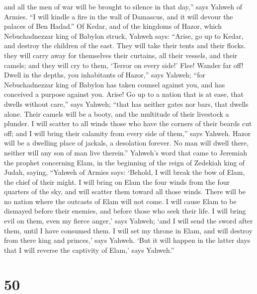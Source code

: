and all the men of war will be brought to silence in that day,'' says
Yahweh of Armies.  ``I will kindle a fire in the wall of
Damascus, and it will devour the palaces of Ben Hadad.'' 
Of Kedar, and of the kingdoms of Hazor, which Nebuchadnezzar king of
Babylon struck, Yahweh says: ``Arise, go up to Kedar, and destroy the
children of the east.  They will take their tents and
their flocks. they will carry away for themselves their curtains, all
their vessels, and their camels; and they will cry to them, `Terror on
every side!'  Flee! Wander far off! Dwell in the depths,
you inhabitants of Hazor,'' says Yahweh; ``for Nebuchadnezzar king of
Babylon has taken counsel against you, and has conceived a purpose
against you.  Arise! Go up to a nation that is at ease,
that dwells without care,'' says Yahweh; ``that has neither gates nor
bars, that dwells alone.  Their camels will be a booty,
and the multitude of their livestock a plunder. I will scatter to all
winds those who have the corners of their beards cut off; and I will
bring their calamity from every side of them,'' says Yahweh.
 Hazor will be a dwelling place of jackals, a desolation
forever. No man will dwell there, neither will any son of man live
therein.''  Yahweh's word that came to Jeremiah the
prophet concerning Elam, in the beginning of the reign of Zedekiah king
of Judah, saying,  ``Yahweh of Armies says: `Behold, I
will break the bow of Elam, the chief of their might.  I
will bring on Elam the four winds from the four quarters of the sky, and
will scatter them toward all those winds. There will be no nation where
the outcasts of Elam will not come.  I will cause Elam to
be dismayed before their enemies, and before those who seek their life.
I will bring evil on them, even my fierce anger,' says Yahweh; `and I
will send the sword after them, until I have consumed them.
 I will set my throne in Elam, and will destroy from
there king and princes,' says Yahweh.  `But it will
happen in the latter days that I will reverse the captivity of Elam,'
says Yahweh.''

\hypertarget{section-49}{%
\section{50}\label{section-49}}

